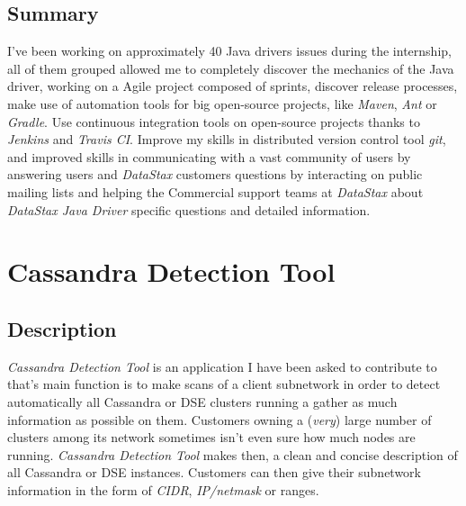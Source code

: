 \documentclass[a4paper]{report}
\newcommand{\ds}{\emph{DataStax\xspace}}
\newcommand{\djd}{\emph{DataStax Java Driver\xspace}}
\begin{document}
\section{Summary}
I've been working on approximately 40 Java drivers issues during the internship, all of them grouped allowed me to completely discover the mechanics of the Java driver, working on a Agile project composed of sprints, discover release processes, make use of automation tools for big open-source projects, like \emph{Maven}, \emph{Ant} or \emph{Gradle}. Use continuous integration tools on open-source projects thanks to \emph{Jenkins} and \emph{Travis CI}. Improve my skills in distributed version control tool \emph{git}, and improved skills in communicating with a vast community of users by answering users and \ds{} customers questions by interacting on public mailing lists and helping the Commercial support teams at \ds{} about \djd{} specific questions and detailed information.




\chapter{Cassandra Detection Tool}

\section{Description}
\emph{Cassandra Detection Tool} is an application I have been asked to contribute to that's main function is to make scans of a client subnetwork in order to detect automatically all Cassandra or DSE clusters running a gather as much information as possible on them. Customers owning a (\emph{very}) large number of clusters among its network sometimes isn't even sure how much nodes are running. \emph{Cassandra Detection Tool} makes then, a clean and concise description of all Cassandra or DSE instances. Customers can then give their subnetwork information in the form of \emph{CIDR}, \emph{IP/netmask} or ranges.
\end{document}
